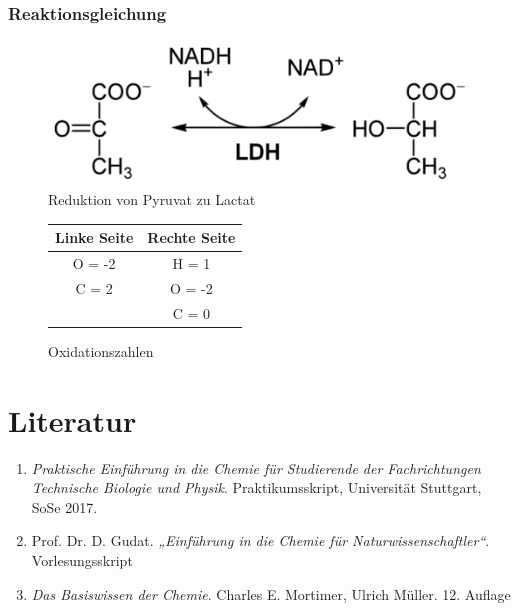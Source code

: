 \documentclass{scrartcl}
\begin{document}
\newpage
\subsubsection*{Reaktionsgleichung}
\begin{figure}[h]
	\centering
	\caption{Reduktion von Pyruvat zu Lactat\protect\footnotemark}
	\includegraphics[scale=.5]{LDH_reaction.pdf}
	\end{figure}
	\begin{figure}[h]
	\centering
	\caption{Oxidationszahlen}
	\begin{tabular}{c c}
			Linke Seite & Rechte Seite \\ \hline
			O = -2 & H = 1 \\
			C = 2 & O = -2 \\
			& C = 0
	\end{tabular}
\end{figure}

\section{Literatur}
\begin{enumerate}[label=(\arabic*)]
	\item \emph{Praktische Einführung in die Chemie
für Studierende der Fachrichtungen
Technische Biologie und Physik}. Praktikumsskript, Universität Stuttgart,
SoSe 2017.  
	\item Prof. Dr. D. Gudat. \emph{„Einführung in die Chemie für Naturwissenschaftler“}. Vorlesungsskript
	\item \emph{Das Basiswissen der Chemie}. Charles E. Mortimer, Ulrich Müller. 12. Auflage
\end{enumerate}
\end{document}
